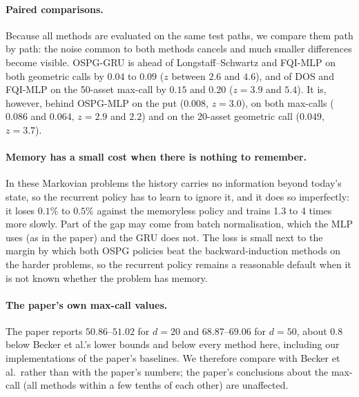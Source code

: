 \paragraph{Paired comparisons.}
Because all methods are evaluated on the same test paths, we compare them path by path:
the noise common to both methods cancels and much smaller differences become visible. OSPG-GRU is ahead of Longstaff--Schwartz and FQI-MLP on both
geometric calls by $0.04$ to $0.09$ ($z$ between $2.6$ and $4.6$), and of DOS and FQI-MLP on
the 50-asset max-call by $0.15$ and $0.20$ ($z=3.9$ and $5.4$). It is, however, behind
OSPG-MLP on the put ($0.008$, $z=3.0$), on both max-calls ($0.086$ and $0.064$, $z=2.9$ and
$2.2$) and on the 20-asset geometric call ($0.049$, $z=3.7$).

\paragraph{Memory has a small cost when there is nothing to remember.}
In these Markovian problems the history carries no information beyond today's state,
so the recurrent policy has to learn to ignore it, and it does so imperfectly: it loses
$0.1\%$ to $0.5\%$ against the memoryless policy and trains 1.3 to 4 times more slowly.
Part of the gap may come from batch normalisation, which the MLP uses (as in the paper)
and the GRU does not. The loss is small next to the margin by which both OSPG policies beat
the backward-induction methods on the harder problems, so the recurrent policy remains a
reasonable default when it is not known whether the problem has memory.

\paragraph{The paper's own max-call values.}
The paper reports $50.86$--$51.02$ for $d=20$ and $68.87$--$69.06$ for $d=50$, about $0.8$
below Becker et al.'s lower bounds and below every method here, including our
implementations of the paper's baselines. We therefore compare with Becker et al.\ rather than with the
paper's numbers; the paper's conclusions about the max-call (all methods within a few
tenths of each other) are unaffected.
